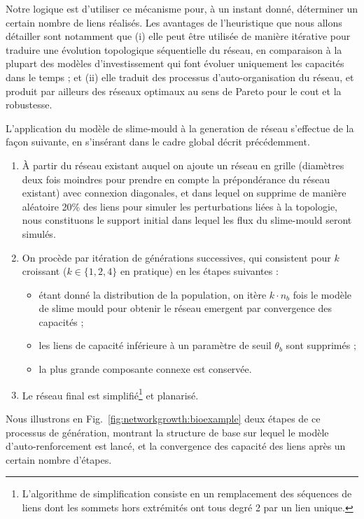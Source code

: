 Notre logique est d'utiliser ce mécanisme pour, à un instant donné, déterminer un certain nombre de liens réalisés. Les avantages de l'heuristique que nous allons détailler sont notamment que (i) elle peut être utilisée de manière itérative pour traduire une évolution topologique séquentielle du réseau, en comparaison à la plupart des modèles d'investissement qui font évoluer uniquement les capacités dans le temps ; et (ii) elle traduit des processus d'auto-organisation du réseau, et produit par ailleurs des réseaux optimaux au sens de Pareto pour le cout et la robustesse.


L'application du modèle de slime-mould à la generation de réseau s'effectue de la façon suivante, en s'insérant dans le cadre global décrit précédemment.

\begin{enumerate}
	\item À partir du réseau existant auquel on ajoute un réseau en grille (diamètres deux fois moindres pour prendre en compte la prépondérance du réseau existant) avec connexion diagonales, et dans lequel on supprime de manière aléatoire 20\% des liens pour simuler les perturbations liées à la topologie, nous constituons le support initial dans lequel les flux du slime-mould seront simulés.
	\item On procède par itération de générations successives, qui consistent pour $k$ croissant ($k\in \{ 1,2,4 \}$ en pratique) en les étapes suivantes :
	\begin{itemize}
		\item étant donné la distribution de la population, on itère $k\cdot n_b$ fois le modèle de slime mould pour obtenir le réseau emergent par convergence des capacités ;
		\item les liens de capacité inférieure à un paramètre de seuil $\theta_b$ sont supprimés ;
		\item la plus grande composante connexe est conservée.
	\end{itemize}
	\item Le réseau final est simplifié\footnote{L'algorithme de simplification consiste en un remplacement des séquences de liens dont les sommets hors extrémités ont tous degré 2 par un lien unique.} et planarisé.
\end{enumerate}

Nous illustrons en Fig.~\ref{fig:networkgrowth:bioexample} deux étapes de ce processus de génération, montrant la structure de base sur lequel le modèle d'auto-renforcement est lancé, et la convergence des capacité des liens après un certain nombre d'étapes.



